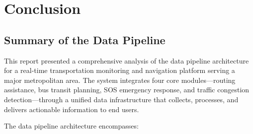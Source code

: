 \chapter{Conclusion}

\section{Summary of the Data Pipeline}

This report presented a comprehensive analysis of the data pipeline architecture for a real-time transportation monitoring and navigation platform serving a major metropolitan area. The system integrates four core modules—routing assistance, bus transit planning, SOS emergency response, and traffic congestion detection—through a unified data infrastructure that collects, processes, and delivers actionable information to end users.

The data pipeline architecture encompasses:

